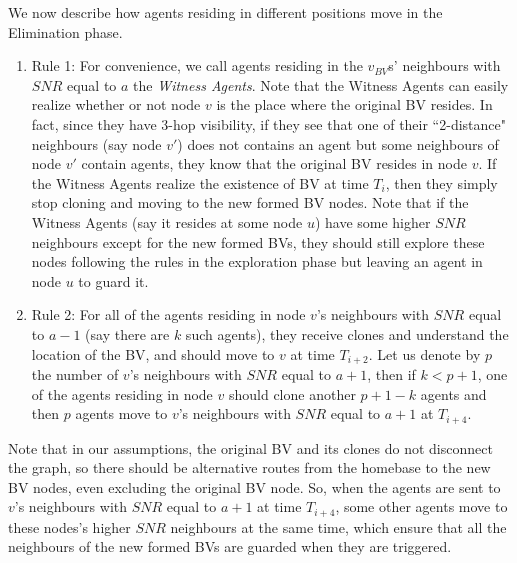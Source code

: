 We now  describe how agents residing in different positions move in the Elimination phase.
\begin{enumerate}

\item Rule 1: For convenience, we call agents residing in the   $v_{BV}$s' neighbours with $SNR$ equal to $a$ the {\em Witness Agents}. Note that the  Witness Agents can easily realize whether or not node $v$ is the place where the original BV resides. In fact, since they have 3-hop visibility, if they see that one of their ``2-distance" neighbours (say node $v'$) does not contains an agent but some neighbours of node $v'$ contain agents, they   know that the original BV resides in node $v$. If the Witness Agents realize the existence of BV at time  $T_i$, then they simply stop cloning and moving to the new formed BV nodes. Note that if the Witness Agents (say it resides at some node $u$) have some higher $SNR$ neighbours except for the new formed BVs, they should still explore these nodes following the rules in the exploration phase but leaving an agent in node $u$ to guard it.  

\item Rule 2: For all of the agents residing in node $v$'s neighbours with $SNR$ equal to $a-1$ (say  there are $k$ such agents), they receive clones and understand the location of the BV,  and should move to $v$ at  time $T_{i+2}$. Let us denote by $p$ the number of $v$'s neighbours with $SNR$ equal to $a+1$, then if $k< p+1$, one of the agents residing in node $v$ should clone another $p+1-k$ agents and then $p$ agents move to $v$'s neighbours with $SNR$ equal to $a+1$ at $T_{i+4}$.
\end{enumerate}

 Note that in our assumptions, the original BV and its clones do not disconnect the graph,  so there should be alternative routes from the homebase to the new BV nodes, even excluding   the original BV node.   So, when the agents are sent to $v$'s neighbours with $SNR$ equal to $a+1$ at time $T_{i+4}$, some other agents move to these nodes's higher $SNR$ neighbours at the same time, which ensure that all the neighbours of the new formed BVs are guarded when they are triggered. 

